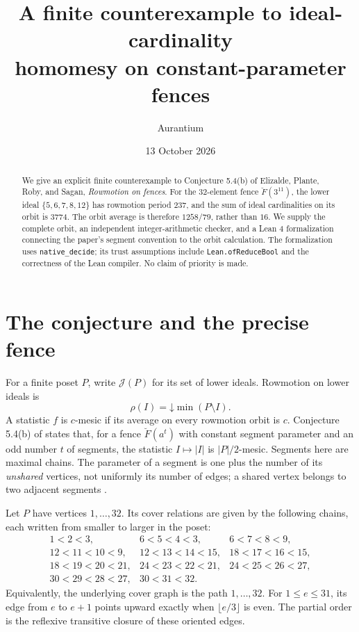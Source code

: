 \documentclass[11pt]{article}
\title{A finite counterexample to ideal-cardinality\protect\\ homomesy on constant-parameter fences}
\author{Aurantium}
\date{13 October 2026}
\newcommand{\JJ}{\mathcal J}
\newcommand{\FF}{\breve F}
\begin{document}
\maketitle
\begin{abstract}
We give an explicit finite counterexample to Conjecture 5.4(b) of
Elizalde, Plante, Roby, and Sagan, \emph{Rowmotion on fences}.
For the 32-element fence $\FF(3^{11})$, the lower ideal
$\{5,6,7,8,12\}$ has rowmotion period 237, and the sum of ideal
cardinalities on its orbit is 3774. The orbit average is therefore
$1258/79$, rather than $16$. We supply the complete orbit, an independent
integer-arithmetic checker, and a Lean 4 formalization connecting the
paper's segment convention to the orbit calculation. The formalization
uses \texttt{native\_decide}; its trust assumptions include
\texttt{Lean.ofReduceBool} and the correctness of the Lean compiler.
No claim of priority is made.
\end{abstract}

\section{The conjecture and the precise fence}
For a finite poset $P$, write $\JJ(P)$ for its set of lower ideals.
Rowmotion on lower ideals is
\[
  \rho(I)=\mathord\downarrow\min(P\setminus I).
\]
A statistic $f$ is $c$-mesic if its average on every rowmotion orbit is
$c$. Conjecture 5.4(b) of \cite[p.~35]{eprs} states that, for a fence
$\FF(a^t)$ with constant segment parameter and an odd number $t$ of
segments, the statistic $I\mapsto |I|$ is $|P|/2$-mesic.
Segments here are maximal chains. The parameter of a segment is one plus
the number of its \emph{unshared} vertices, not uniformly its number of edges;
a shared vertex belongs to two adjacent segments \cite[p.~17]{eprs}.

Let $P$ have vertices $1,\ldots,32$. Its cover relations are given by the
following chains, each written from smaller to larger in the poset:
\[
\begin{array}{lll}
1<2<3, & 6<5<4<3, & 6<7<8<9,\\
12<11<10<9, & 12<13<14<15, & 18<17<16<15,\\
18<19<20<21, & 24<23<22<21, & 24<25<26<27,\\
30<29<28<27, & 30<31<32. &
\end{array}
\]
Equivalently, the underlying cover graph is the path $1,\ldots,32$.
For $1\le e\le31$, its edge from $e$ to $e+1$ points upward exactly
when $\lfloor e/3\rfloor$ is even. The partial order is the reflexive
transitive closure of these oriented edges.
\end{document}
